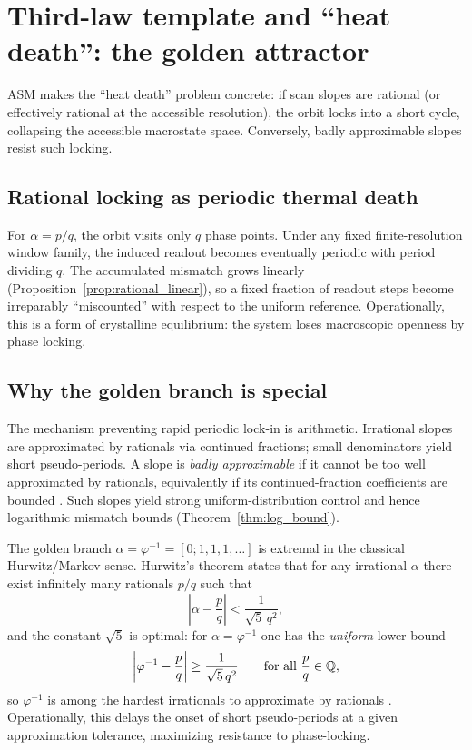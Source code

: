 \section{Third-law template and ``heat death'': the golden attractor}
\label{sec:third_law}

ASM makes the ``heat death'' problem concrete: if scan slopes are rational (or effectively rational at the accessible resolution), the orbit locks into a short cycle, collapsing the accessible macrostate space. Conversely, badly approximable slopes resist such locking.

\subsection{Rational locking as periodic thermal death}

For $\alpha=p/q$, the orbit visits only $q$ phase points. Under any fixed finite-resolution window family, the induced readout becomes eventually periodic with period dividing $q$. The accumulated mismatch grows linearly (Proposition~\ref{prop:rational_linear}), so a fixed fraction of readout steps become irreparably ``miscounted'' with respect to the uniform reference. Operationally, this is a form of crystalline equilibrium: the system loses macroscopic openness by phase locking.

\subsection{Why the golden branch is special}

The mechanism preventing rapid periodic lock-in is arithmetic. Irrational slopes are approximated by rationals via continued fractions; small denominators yield short pseudo-periods. A slope is \emph{badly approximable} if it cannot be too well approximated by rationals, equivalently if its continued-fraction coefficients are bounded \cite{Cassels1957}. Such slopes yield strong uniform-distribution control and hence logarithmic mismatch bounds (Theorem~\ref{thm:log_bound}).

The golden branch $\alpha=\varphi^{-1}=[0;1,1,1,\dots]$ is extremal in the classical Hurwitz/Markov sense. Hurwitz's theorem states that for any irrational $\alpha$ there exist infinitely many rationals $p/q$ such that
\begin{equation}
  \left|\alpha-\frac{p}{q}\right| < \frac{1}{\sqrt{5}\,q^2},
\end{equation}
and the constant $\sqrt{5}$ is optimal: for $\alpha=\varphi^{-1}$ one has the \emph{uniform} lower bound
\begin{equation}
  \left|\varphi^{-1}-\frac{p}{q}\right| \ge \frac{1}{\sqrt{5}\,q^2}\qquad\text{for all } \frac{p}{q}\in\mathbb{Q},
\end{equation}
so $\varphi^{-1}$ is among the hardest irrationals to approximate by rationals \cite{Cassels1957}. Operationally, this delays the onset of short pseudo-periods at a given approximation tolerance, maximizing resistance to phase-locking.

